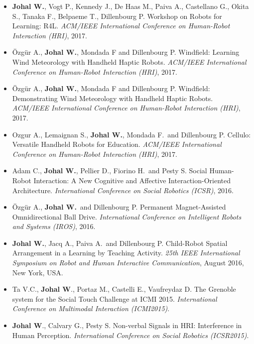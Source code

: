 \begin{itemize}[nosep]
    \item \textbf{Johal W.}, Vogt P., Kennedy J., De Haas M., Paiva A., Castellano G., Okita S., Tanaka F., Belpaeme T., Dillenbourg P. Workshop on Robots for Learning: R4L. \textit{ACM/IEEE International Conference on Human-Robot Interaction (HRI)}, 2017.

    \item Özgür A., \textbf{Johal W.}, Mondada F and Dillenbourg P. Windfield: Learning Wind Meteorology with Handheld Haptic Robots. \textit{ACM/IEEE International Conference on Human-Robot Interaction (HRI)}, 2017.

    \item Özgür A., \textbf{Johal W.}, Mondada F and Dillenbourg P. Windfield: Demonstrating Wind Meteorology with Handheld Haptic Robots. \textit{ACM/IEEE International Conference on Human-Robot Interaction (HRI)}, 2017.

    \item Ozgur A., Lemaignan S., \textbf{Johal W.}, Mondada F.\ and Dillenbourg P. Cellulo: Versatile Handheld Robots for Education. \textit{ACM/IEEE International Conference on Human-Robot Interaction (HRI)}, 2017. \faTrophy

    \item Adam C., \textbf{Johal W.}, Pellier D., Fiorino H.\ and Pesty S. Social Human-Robot Interaction: A New Cognitive and Affective Interaction-Oriented Architecture. \textit{International Conference on Social Robotics (ICSR)}, 2016.

    \item Özgür A., \textbf{Johal W.}\ and Dillenbourg P. Permanent Magnet-Assisted Omnidirectional Ball Drive. \textit{International Conference on Intelligent Robots and Systems (IROS)}, 2016.

    \item \textbf{Johal W.}, Jacq A., Paiva A.\ and Dillenbourg P. Child-Robot Spatial Arrangement in a Learning by Teaching Activity. \textit{25th IEEE International Symposium on Robot and Human Interactive Communication}, August 2016, New York, USA.

    \item Ta V.C., \textbf{Johal W}., Portaz M., Castelli E., Vaufreydaz D. The Grenoble system for the Social Touch Challenge at ICMI 2015. \textit{International Conference on Multimodal Interaction (ICMI2015)}. \faTrophy

    \item \textbf{Johal W}., Calvary G., Pesty S. Non-verbal Signals in HRI: Interference in Human Perception. \textit{International Conference on Social Robotics (ICSR2015)}.


\end{itemize}
